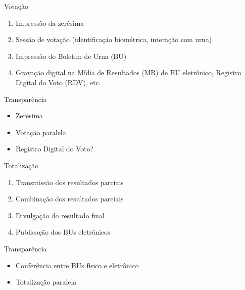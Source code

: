\documentclass[10pt]{beamer}
\begin{document}
\begin{frame}{Votação}
\begin{enumerate}
 \item Impressão da zerésima
 \item Sessão de votação (identificação biométrica, interação com urna)
 \item Impressão do Boletim de Urna (BU)
 \item Gravação digital na Mídia de Resultados (MR) de BU eletrônico, Registro Digital do Voto (RDV), etc.
\end{enumerate}

\bigskip

\begin{flushright}
\begin{minipage}{.75\textwidth}
\begin{block}{\alert{Transparência}}\medskip
\begin{itemize}
 \item Zerésima
 \item Votação paralela
 \item Registro Digital do Voto?
\end{itemize}
\end{block}
\end{minipage}
\end{flushright}
\end{frame}

\begin{frame}{Totalização}
\begin{enumerate}
 \item Transmissão dos resultados parciais
 \item Combinação dos resultados parciais
 \item Divulgação do resultado final
 \item Publicação dos BUs eletrônicos
\end{enumerate}

\bigskip

\begin{flushright}
\begin{minipage}{.75\textwidth}
\begin{block}{\alert{Transparência}}\medskip
\begin{itemize}
 \item Conferência entre BUs físico e eletrônico
 \item Totalização paralela
\end{itemize}
\end{block}
\end{minipage}
\end{flushright}

\end{frame}
\end{document}
